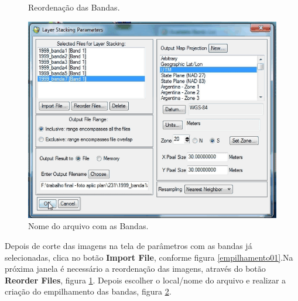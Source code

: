 \begin{itemize}
\begin{figure}[!htpb]
        \caption{Reordenação das Bandas.}
        \label{empilhamento03}
\end{figure}        
\begin{figure}[!htpb]        
        \centering
        \includegraphics[scale=0.4]{imagens/empilhamento05.png}
        \caption{Nome do arquivo com as Bandas.}
        \label{empilhamento05}
\end{figure}
\end{itemize}
\hspace{1.5cm}
Depois de corte das imagens na tela de parâmetros com as bandas já selecionadas, clica no botão \textbf{Import File}, conforme figura \ref{empilhamento01}.Na próxima janela é necessário a reordenação das imagens, através do botão \textbf{Reorder Files}, figura \ref{empilhamento03}. Depois escolher o local/nome do arquivo e realizar a criação do empilhamento das bandas, figura \ref{empilhamento05}. 
